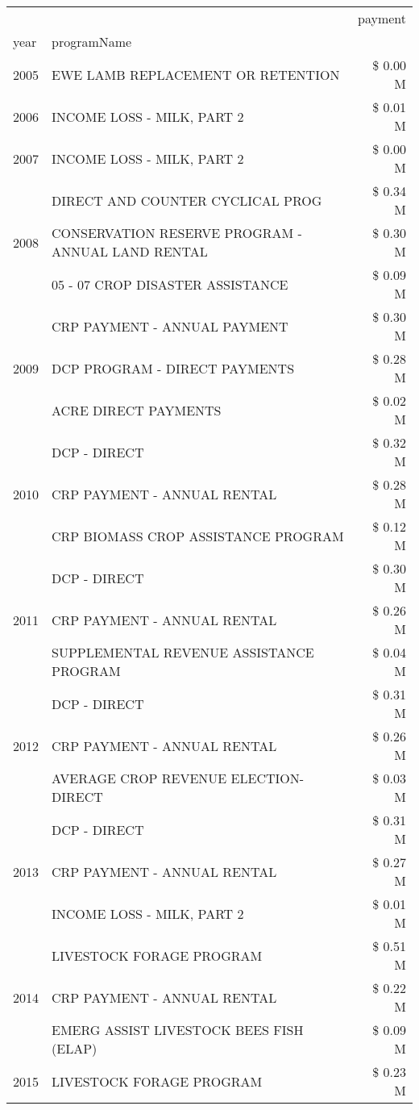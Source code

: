 \begin{tabular}{llr}
\toprule
 &  & payment \\
year & programName &  \\
\midrule
2005 & EWE LAMB REPLACEMENT OR RETENTION & \$ 0.00 M \\
\cline{1-3}
2006 & INCOME LOSS - MILK, PART 2 & \$ 0.01 M \\
\cline{1-3}
2007 & INCOME LOSS - MILK, PART 2 & \$ 0.00 M \\
\cline{1-3}
\multirow[t]{3}{*}{2008} & DIRECT AND COUNTER CYCLICAL PROG & \$ 0.34 M \\
 & CONSERVATION RESERVE PROGRAM - ANNUAL LAND RENTAL & \$ 0.30 M \\
 & 05 - 07 CROP DISASTER ASSISTANCE & \$ 0.09 M \\
\cline{1-3}
\multirow[t]{3}{*}{2009} & CRP PAYMENT - ANNUAL PAYMENT & \$ 0.30 M \\
 & DCP PROGRAM - DIRECT PAYMENTS & \$ 0.28 M \\
 & ACRE DIRECT PAYMENTS & \$ 0.02 M \\
\cline{1-3}
\multirow[t]{3}{*}{2010} & DCP - DIRECT & \$ 0.32 M \\
 & CRP PAYMENT - ANNUAL RENTAL & \$ 0.28 M \\
 & CRP BIOMASS CROP ASSISTANCE PROGRAM & \$ 0.12 M \\
\cline{1-3}
\multirow[t]{3}{*}{2011} & DCP - DIRECT & \$ 0.30 M \\
 & CRP PAYMENT - ANNUAL RENTAL & \$ 0.26 M \\
 & SUPPLEMENTAL REVENUE ASSISTANCE PROGRAM & \$ 0.04 M \\
\cline{1-3}
\multirow[t]{3}{*}{2012} & DCP - DIRECT & \$ 0.31 M \\
 & CRP PAYMENT - ANNUAL RENTAL & \$ 0.26 M \\
 & AVERAGE CROP REVENUE ELECTION-DIRECT & \$ 0.03 M \\
\cline{1-3}
\multirow[t]{3}{*}{2013} & DCP - DIRECT & \$ 0.31 M \\
 & CRP PAYMENT - ANNUAL RENTAL & \$ 0.27 M \\
 & INCOME LOSS - MILK, PART 2 & \$ 0.01 M \\
\cline{1-3}
\multirow[t]{3}{*}{2014} & LIVESTOCK FORAGE PROGRAM & \$ 0.51 M \\
 & CRP PAYMENT - ANNUAL RENTAL & \$ 0.22 M \\
 & EMERG ASSIST LIVESTOCK BEES FISH (ELAP) & \$ 0.09 M \\
\cline{1-3}
\multirow[t]{3}{*}{2015} & LIVESTOCK FORAGE PROGRAM & \$ 0.23 M \\

\end{tabular}
